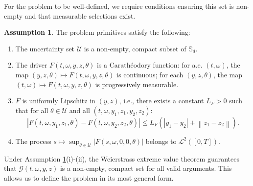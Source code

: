 \documentclass[12pt, letterpaper]{amsart}
\newcommand{\Ucal}{\mathcal{U}}
\newcommand{\Lcalp}[1]{\mathcal{L}^{#1}}
\newcommand{\Sd}{\mathbb{S}_d}
\newcommand{\norm}[1]{\left\lVert#1\right\rVert}
\theoremstyle{plain}
\theoremstyle{definition}
\newtheorem{assumption}[theorem]{Assumption}
\theoremstyle{remark}
\numberwithin{equation}{section} %
\begin{document}
For the problem to be well-defined, we require conditions ensuring this set is non-empty and that measurable selections exist.

\begin{assumption}\label{ass:bsdi_primitives}
The problem primitives satisfy the following:
\begin{enumerate}[label=(\roman*)]
    \item The uncertainty set $\Ucal$ is a non-empty, compact subset of $\Sd$.
    \item The driver $F(t,\omega,y,z,\theta)$ is a Carathéodory function: for a.e. $(t,\omega)$, the map $(y,z,\theta) \mapsto F(t,\omega,y,z,\theta)$ is continuous; for each $(y,z,\theta)$, the map $(t,\omega) \mapsto F(t,\omega,y,z,\theta)$ is progressively measurable.
    \item $F$ is uniformly Lipschitz in $(y,z)$, i.e., there exists a constant $L_F > 0$ such that for all $\theta \in \Ucal$ and all $(t,\omega,y_1,z_1,y_2,z_2)$:
    \[ |F(t,\omega,y_1,z_1,\theta) - F(t,\omega,y_2,z_2,\theta)| \le L_F(|y_1-y_2|+\norm{z_1-z_2}). \]
    \item The process $s \mapsto \sup_{\theta \in \Ucal} |F(s, \omega, 0, 0, \theta)|$ belongs to $\Lcalp{2}([0,T])$.
\end{enumerate}
\end{assumption}

Under Assumption \ref{ass:bsdi_primitives}(i)-(ii), the Weierstrass extreme value theorem guarantees that $\mathcal{G}(t,\omega,y,z)$ is a non-empty, compact set for all valid arguments. This allows us to define the problem in its most general form.
\end{document}
